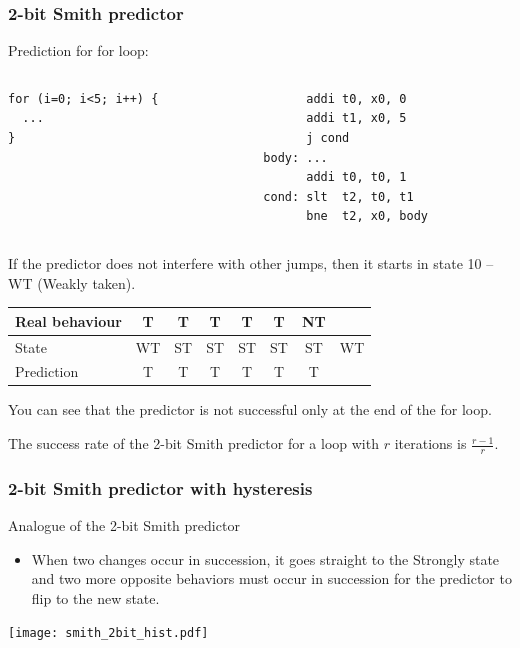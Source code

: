 \documentclass{beamer}
\begin{document}
\begin{frame}[fragile]
\frametitle{2-bit Smith predictor}

Prediction for for loop:

\begin{columns}[T]
\begin{column}{0.35\textwidth}
\begin{verbatim}
for (i=0; i<5; i++) {
  ...
}
\end{verbatim}
\end{column}
\hfill
\begin{column}{0.45\textwidth}
\begin{verbatim}
      addi t0, x0, 0
      addi t1, x0, 5
      j cond
body: ...
      addi t0, t0, 1
cond: slt  t2, t0, t1
      bne  t2, x0, body
\end{verbatim}
\end{column}
\end{columns}
\bigskip
\small
If the predictor does not interfere with other jumps, then it starts in state 10 -- WT (Weakly taken).

\begin{tabular}{|l|c|c|c|c|c|c|c|}\hline
Real behaviour & T & T & T & T & T & NT & \\ \hline
State & WT & ST & ST & ST & ST & ST & WT\\ \hline
Prediction & T & T & T & T & T & {\color{red}T} &\\\hline
\end{tabular}

You can see that the predictor is not successful only at the end of the for loop.

The success rate of the 2-bit Smith predictor for a loop with $r$ iterations is $\frac{r-1}{r}$.
\end{frame}


\begin{frame}
\frametitle{2-bit Smith predictor with hysteresis}

Analogue of the 2-bit Smith predictor
\begin{itemize}
\item When two changes occur in succession, it goes straight to the Strongly state and two more opposite behaviors must occur in succession for the predictor to flip to the new state.
\end{itemize}

\begin{center}
\texttt{[image: smith\_2bit\_hist.pdf]}
\end{center}
\end{frame}
\end{document}
